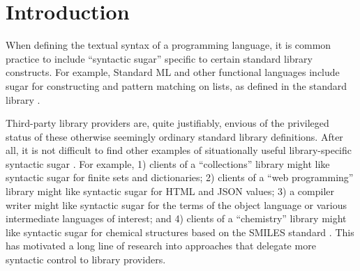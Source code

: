 \documentclass[acmlarge,review,anonymous]{acmart}\settopmatter{printfolios=true}
\begin{document}




\maketitle

\newcommand{\introSec}{Introduction}
\section{\protect\introSec}
\label{sec:intro}
When defining the textual syntax of a programming language, it is common practice to include ``syntactic sugar'' specific to certain standard library constructs.   
For example, Standard ML and other functional languages include sugar for constructing and pattern matching on lists, as defined in the standard library \cite{mthm97-for-dart}.

Third-party library providers are, quite justifiably, envious of the privileged status of these otherwise seemingly ordinary standard library definitions. After all, it is not difficult to find other examples of situationally useful library-specific syntactic sugar \cite{TSLs}. For example, 1) clients of a ``collections'' library might like syntactic sugar for finite sets and dictionaries; 2) clients of a ``web programming'' library might like syntactic sugar for HTML and JSON values; 3) a compiler writer might like syntactic sugar for the terms of the object language or various intermediate languages of interest; and 4) clients of a ``chemistry'' library might like syntactic sugar for chemical structures based on the SMILES standard \cite{anderson1987smiles}. This has motivated a long line of research into approaches that delegate more syntactic control to library providers.
\end{document}
